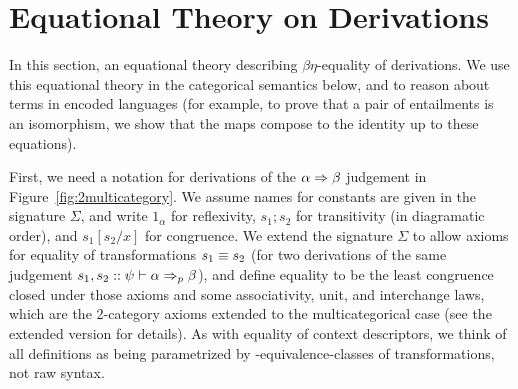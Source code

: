 \section{Equational Theory on Derivations}
\label{sec:equational}

In this section, an equational theory describing $\beta\eta$-equality of
derivations.  We use this equational theory in the categorical semantics
below, and to reason about terms in encoded languages (for example, to
prove that a pair of entailments is an isomorphism, we show that the
maps compose to the identity up to these equations).

First, we need a notation for derivations of the $\alpha \Rightarrow \beta$
judgement in Figure~\ref{fig:2multicategory}.  We assume names for
constants are given in the signature $\Sigma$, and write $1_\alpha$ for
reflexivity, $s_1;s_2$ for transitivity (in diagramatic order), and
$s_1[s_2/x]$ for congruence.  We extend the signature $\Sigma$ to allow
axioms for equality of transformations $s_1 \equiv s_2$ (for two
derivations of the same judgement $s_1,s_2 ::
\psi \vdash \alpha \Rightarrow_{p} \beta$), and define equality to be the least
congruence closed under those axioms and some associativity, unit, and
interchange laws, which are the 2-category axioms extended to the
multicategorical case (see the extended version for details).  As with
equality of context descriptors, we think of all definitions as being
parametrized by \deq-equivalence-classes of transformations, not raw
syntax.

